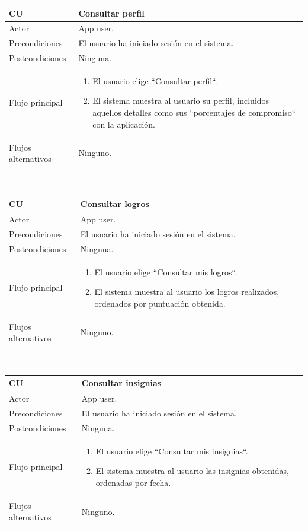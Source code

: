 \documentclass[twoside]{report}
\newcommand\addrow[2]{#1 &#2\\ }
\newcommand\addheading[2]{#1 &#2\\ \hline}
\newcommand\tabularhead{\begin{tabular}{lp{0.7\textwidth}}
\hline
}
\newenvironment{usecase}{\tabularhead}
{\hline\end{tabular}}
\begin{document}
\vspace{0.5cm}

\begin{usecase}
  \addheading{\textbf{CU\arabic{usecase}}}{Consultar perfil} 
  \addrow{Actor}{App user.}
  \addrow{Precondiciones}{El usuario ha iniciado sesión en el sistema.}
  \addrow{Postcondiciones}{Ninguna.}
  \addrow{Flujo principal}{
  		\begin{enumerate}
  		\item El usuario elige “Consultar perfil“.
  		\item El sistema muestra al usuario su perfil, incluidos aquellos detalles como sus  “porcentajes de compromiso“ con la aplicación.
  		\end{enumerate}
  }
  \addrow{Flujos alternativos}{Ninguno.}
\end{usecase}\\

\vspace{0.5cm}

\begin{usecase}
  \addheading{\textbf{CU\arabic{usecase}}}{Consultar logros} 
  \addrow{Actor}{App user.}
  \addrow{Precondiciones}{El usuario ha iniciado sesión en el sistema.}
  \addrow{Postcondiciones}{Ninguna.}
  \addrow{Flujo principal}{
  		\begin{enumerate}
  		\item El usuario elige “Consultar mis logros“.
  		\item El sistema muestra al usuario los logros realizados, ordenados por puntuación obtenida.
  		\end{enumerate}
  }
  \addrow{Flujos alternativos}{Ninguno.}
\end{usecase}\\

\vspace{0.5cm}

\begin{usecase}
  \addheading{\textbf{CU\arabic{usecase}}}{Consultar insignias} 
  \addrow{Actor}{App user.}
  \addrow{Precondiciones}{El usuario ha iniciado sesión en el sistema.}
  \addrow{Postcondiciones}{Ninguna.}
  \addrow{Flujo principal}{
  		\begin{enumerate}
  		\item El usuario elige “Consultar mis insignias“.
  		\item El sistema muestra al usuario las insignias obtenidas, ordenadas por fecha.
  		\end{enumerate}
  }
  \addrow{Flujos alternativos}{Ninguno.}
\end{usecase}\\
\end{document}
